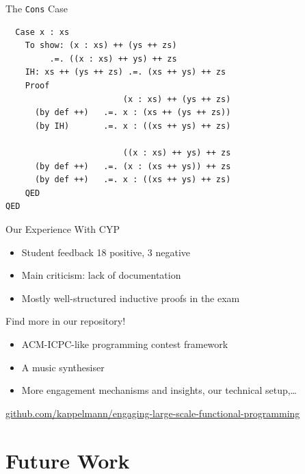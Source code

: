 \documentclass{beamer}
\begin{document}
\begin{frame}[fragile]{The \texttt{Cons} Case}
  \begin{lstlisting}
  Case x : xs
    To show: (x : xs) ++ (ys ++ zs)
         .=. ((x : xs) ++ ys) ++ zs
    IH: xs ++ (ys ++ zs) .=. (xs ++ ys) ++ zs
    Proof
                        (x : xs) ++ (ys ++ zs)
      (by def ++)   .=. x : (xs ++ (ys ++ zs))
      (by IH)       .=. x : ((xs ++ ys) ++ zs)

                        ((x : xs) ++ ys) ++ zs
      (by def ++)   .=. (x : (xs ++ ys)) ++ zs
      (by def ++)   .=. x : ((xs ++ ys) ++ zs)
    QED
QED
  \end{lstlisting}
\end{frame}

\begin{frame}{Our Experience With CYP}
\begin{itemize}[<+->]
  \item Student feedback 18 positive, 3 negative
  \item Main criticism: lack of documentation
  \item Mostly well-structured inductive proofs in the exam
\end{itemize}
\end{frame}


\begin{frame}
\centerline{\alert{\huge{Find more in our repository!}}}
\begin{itemize}
\item ACM-ICPC-like programming contest framework
\item A music synthesiser
\item More engagement mechanisms and insights, our technical setup,\dots
\end{itemize}

\vspace{\baselineskip}
\centerline{\small\url{github.com/kappelmann/engaging-large-scale-functional-programming}}
\end{frame}



\section{Future Work}
\end{document}
